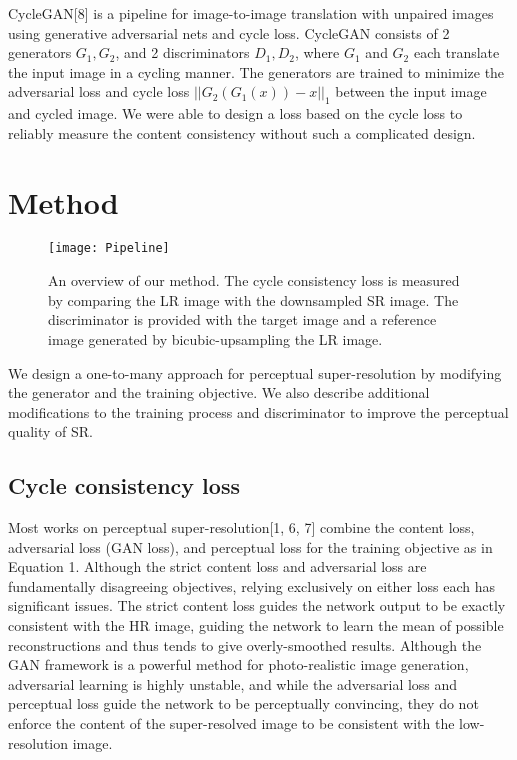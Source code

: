 \documentclass{article}
\begin{document}
CycleGAN[8] is a pipeline for image-to-image translation with unpaired images using generative adversarial nets and cycle loss. CycleGAN consists of 2 generators $G_{1}, G_{2}$, and 2 discriminators $D_{1}, D_{2}$, where $G_{1}$ and $G_{2}$ each translate the input image in a cycling manner. The generators are trained to minimize the adversarial loss and cycle loss $||G_{2}(G_{1}(x)) - x||_{1}$ between the input image and cycled image.
We were able to design a loss based on the cycle loss to reliably measure the content consistency without such a complicated design.

\section{Method}
\label{headings}


\begin{figure}
  \centering
  \texttt{[image: Pipeline]}
  \caption{An overview of our method. The cycle consistency loss is measured by comparing the LR image with the downsampled SR image. The discriminator is provided with the target image and a reference image generated by bicubic-upsampling the LR image.}
\end{figure}

We design a one-to-many approach for perceptual super-resolution by modifying the generator and the training objective. We also describe additional modifications to the training process and discriminator to improve the perceptual quality of SR.

\subsection{Cycle consistency loss}

Most works on perceptual super-resolution[1, 6, 7] combine the content loss, adversarial loss (GAN loss), and perceptual loss for the training objective as in Equation 1. Although the strict content loss and adversarial loss are fundamentally disagreeing objectives, relying exclusively on either loss each has significant issues. The strict content loss guides the network output to be exactly consistent with the HR image, guiding the network to learn the mean of possible reconstructions and thus tends to give overly-smoothed results. Although the GAN framework is a powerful method for photo-realistic image generation, adversarial learning is highly unstable, and while the adversarial loss and perceptual loss guide the network to be perceptually convincing, they do not enforce the content of the super-resolved image to be consistent with the low-resolution image.
\end{document}
